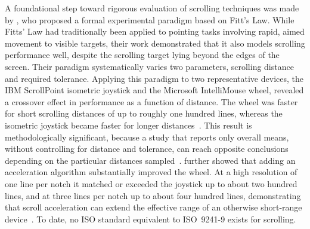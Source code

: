 \documentclass[12pt,a4paper]{report}
\begin{document}
        A foundational step toward rigorous evaluation of scrolling techniques was made by \citeauthor{hinckley2002quantitative}, who proposed a formal experimental paradigm based on Fitt's Law. While Fitts' Law had traditionally been applied to pointing tasks involving rapid, aimed movement to visible targets, their work demonstrated that it also models scrolling performance well, despite the scrolling target lying beyond the edges of the screen. Their paradigm systematically varies two parameters, scrolling distance and required tolerance. Applying this paradigm to two representative devices, the IBM ScrollPoint isometric joystick and the Microsoft IntelliMouse wheel, revealed a crossover effect in performance as a function of distance. The wheel was faster for short scrolling distances of up to roughly one hundred lines, whereas the isometric joystick became faster for longer distances~\cite{hinckley2002quantitative}. This result is methodologically significant, because a study that reports only overall means, without controlling for distance and tolerance, can reach opposite conclusions depending on the particular distances sampled~\cite{hinckley2002quantitative}. \citeauthor{hinckley2002quantitative} further showed that adding an acceleration algorithm substantially improved the wheel. At a high resolution of one line per notch it matched or exceeded the joystick up to about two hundred lines, and at three lines per notch up to about four hundred lines, demonstrating that scroll acceleration can extend the effective range of an otherwise short-range device~\cite{hinckley2002quantitative}. To date, no ISO standard equivalent to ISO~9241-9 exists for scrolling. 
\end{document}

